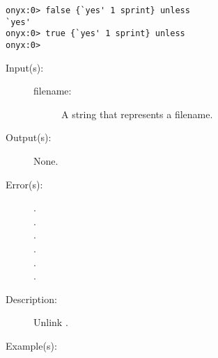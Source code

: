 \begin{description}
\begin{description}
\begin{verbatim}
onyx:0> false {`yes' 1 sprint} unless
`yes'
onyx:0> true {`yes' 1 sprint} unless
onyx:0>
		\end{verbatim}
	\end{description}
\label{systemdict:unlink}
\item[{\onyxop{filename}{unlink}{--}}: ]
	\begin{description}\item[]
	\item[Input(s): ]
		\begin{description}\item[]
		\item[filename: ]
			A string that represents a filename.
		\end{description}
	\item[Output(s): ] None.
	\item[Error(s): ]
		\begin{description}\item[]
		\item[.]
		\item[.]
		\item[.]
		\item[.]
		\item[.]
		\item[.]
		\end{description}
	\item[Description: ]
		Unlink .
	\item[Example(s): ]\begin{verbatim}


\end{verbatim}
\end{description}
\end{description}

